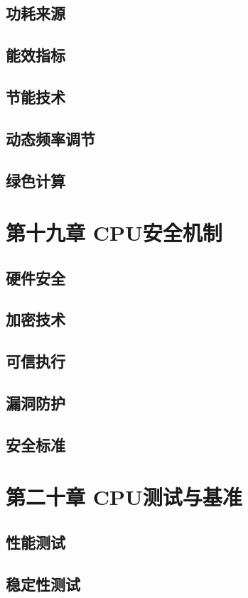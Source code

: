 \documentclass[12pt,UTF8]{ctexbook}
\begin{document}
\section{功耗来源}
\section{能效指标}
\section{节能技术}
\section{动态频率调节}
\section{绿色计算}

\chapter{第十九章 CPU安全机制}

\section{硬件安全}
\section{加密技术}
\section{可信执行}
\section{漏洞防护}
\section{安全标准}

\chapter{第二十章 CPU测试与基准}

\section{性能测试}
\section{稳定性测试}
\end{document}
